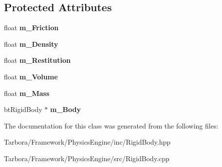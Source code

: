 \subsection*{Protected Attributes}
\begin{DoxyCompactItemize}
\item 
\mbox{\label{classTarbora_1_1RigidBody_a9663e9ae26e8ca6b53f0e9f35e1613dc}} 
float {\bfseries m\+\_\+\+Friction}
\item 
\mbox{\label{classTarbora_1_1RigidBody_a52a91e03c8a6d0f99f2a1ce1c85971b4}} 
float {\bfseries m\+\_\+\+Density}
\item 
\mbox{\label{classTarbora_1_1RigidBody_ac0b051f209ddc0aae2b79239d8a900f5}} 
float {\bfseries m\+\_\+\+Restitution}
\item 
\mbox{\label{classTarbora_1_1RigidBody_ae9624225a57bb682fb6e86d12677f502}} 
float {\bfseries m\+\_\+\+Volume}
\item 
\mbox{\label{classTarbora_1_1RigidBody_ad112c7c613a0557b132b10b29d62a110}} 
float {\bfseries m\+\_\+\+Mass}
\item 
\mbox{\label{classTarbora_1_1RigidBody_abe5878296d0cfc6796ff6383db14d062}} 
bt\+Rigid\+Body $\ast$ {\bfseries m\+\_\+\+Body}
\end{DoxyCompactItemize}


The documentation for this class was generated from the following files\+:\begin{DoxyCompactItemize}
\item 
Tarbora/\+Framework/\+Physics\+Engine/inc/Rigid\+Body.\+hpp\item 
Tarbora/\+Framework/\+Physics\+Engine/src/Rigid\+Body.\+cpp\end{DoxyCompactItemize}
